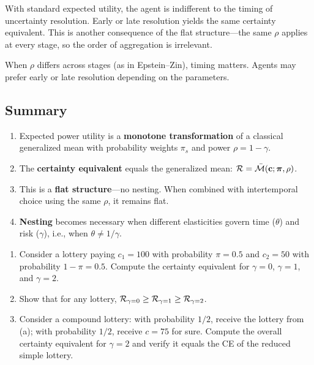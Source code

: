 \begin{calloutnote}
With standard expected utility, the agent is indifferent to the timing of uncertainty resolution. Early or late resolution yields the same certainty equivalent. This is another consequence of the flat structure---the same $\rho$ applies at every stage, so the order of aggregation is irrelevant.

When $\rho$ differs across stages (as in Epstein--Zin), timing matters. Agents may prefer early or late resolution depending on the parameters.
\end{calloutnote}

\subsection{Summary}
\label{subsec:risk-summary}

\begin{calloutimportant}
\begin{enumerate}[label=(\roman*), leftmargin=2em]
    \item Expected power utility is a \textbf{monotone transformation} of a classical generalized mean with probability weights $\pi_s$ and power $\rho = 1 - \gamma$.
    
    \item The \textbf{certainty equivalent} equals the generalized mean: $\mathcal{R} = \bar{\mathcal{M}}(\mathbf{c}; \bm{\pi}, \rho)$.
    
    \item This is a \textbf{flat structure}---no nesting. When combined with intertemporal choice using the same $\rho$, it remains flat.
    
    \item \textbf{Nesting} becomes necessary when different elasticities govern time ($\theta$) and risk ($\gamma$), i.e., when $\theta \neq 1/\gamma$.
\end{enumerate}
\end{calloutimportant}

\begin{callouttip}[Exercise]
\begin{enumerate}[label=(\alph*), leftmargin=1.5em]
    \item Consider a lottery paying $c_1 = 100$ with probability $\pi = 0.5$ and $c_2 = 50$ with probability $1-\pi = 0.5$. Compute the certainty equivalent for $\gamma = 0$, $\gamma = 1$, and $\gamma = 2$.
    \item Show that for any lottery, $\mathcal{R}_{\gamma=0} \geq \mathcal{R}_{\gamma=1} \geq \mathcal{R}_{\gamma=2}$.
    \item Consider a compound lottery: with probability $1/2$, receive the lottery from (a); with probability $1/2$, receive $c = 75$ for sure. Compute the overall certainty equivalent for $\gamma = 2$ and verify it equals the CE of the reduced simple lottery.
\end{enumerate}
\end{callouttip}
